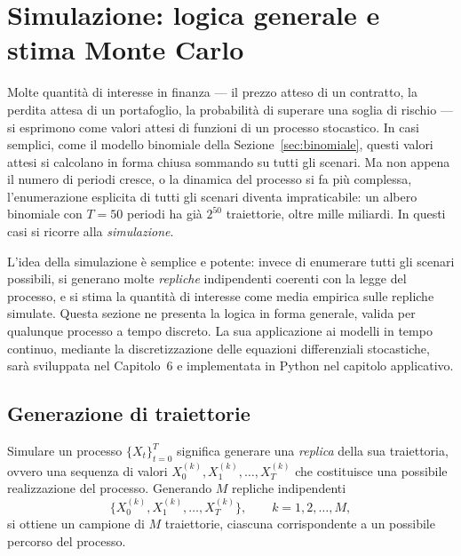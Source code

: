 %

\section{Simulazione: logica generale e stima Monte Carlo}
\label{sec:simulazione}

\noindent
Molte quantit\`{a} di interesse in finanza --- il prezzo atteso di un
contratto, la perdita attesa di un portafoglio, la probabilit\`{a} di
superare una soglia di rischio --- si esprimono come valori attesi di
funzioni di un processo stocastico. In casi semplici, come il modello
binomiale della Sezione~\ref{sec:binomiale}, questi valori attesi si
calcolano in forma chiusa sommando su tutti gli scenari. Ma non appena
il numero di periodi cresce, o la dinamica del processo si fa pi\`{u}
complessa, l'enumerazione esplicita di tutti gli scenari diventa
impraticabile: un albero binomiale con $T=50$ periodi ha gi\`{a}
$2^{50}$ traiettorie, oltre mille miliardi. In questi casi si ricorre
alla \emph{simulazione}.

L'idea della simulazione \`{e} semplice e potente: invece di enumerare
tutti gli scenari possibili, si generano molte \emph{repliche}
indipendenti coerenti con la legge del processo, e si stima la quantit\`{a}
di interesse come media empirica sulle repliche simulate. Questa
sezione ne presenta la logica in forma generale, valida per qualunque
processo a tempo discreto. La sua applicazione ai modelli in tempo
continuo, mediante la discretizzazione delle equazioni differenziali
stocastiche, sar\`{a} sviluppata nel Capitolo~6 e implementata in
Python nel capitolo applicativo.

\subsection{Generazione di traiettorie}

\noindent
Simulare un processo $\{X_t\}_{t=0}^{T}$ significa generare una
\emph{replica} della sua traiettoria, ovvero una sequenza di valori
$X_0^{(k)},X_1^{(k)},\ldots,X_T^{(k)}$ che costituisce una possibile
realizzazione del processo. Generando $M$ repliche indipendenti
\[
\bigl\{X_0^{(k)},X_1^{(k)},\ldots,X_T^{(k)}\bigr\},
\qquad k=1,2,\ldots,M,
\]
si ottiene un campione di $M$ traiettorie, ciascuna corrispondente a
un possibile percorso del processo.

